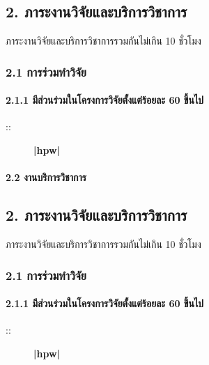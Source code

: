 \documentclass[a4paper,12pt,english]{sphinxmanual}
\begin{document}
\subsection{2. ภาระงานวิจัยและบริการวิชาการ}
\label{\detokenize{2research:id1}}\label{\detokenize{2research::doc}}
ภาระงานวิจัยและบริการวิชาการรวมกันไม่เกิน 10 ชั่วโมง


\subsubsection{2.1 การร่วมทำวิจัย}
\label{\detokenize{2research:id2}}

\paragraph{2.1.1 มีส่วนร่วมในโครงการวิจัยตั้งแต่ร้อยละ 60 ขึ้นไป}
\label{\detokenize{2research:id3}}\begin{description}
\item[{::}]   {\color{red}\bfseries{}|hpw|}

\end{description}


\paragraph{2.2 งานบริการวิชาการ}
\label{\detokenize{2research:id4}}

\subsection{2. ภาระงานวิจัยและบริการวิชาการ}
\label{\detokenize{3service:id1}}\label{\detokenize{3service::doc}}
ภาระงานวิจัยและบริการวิชาการรวมกันไม่เกิน 10 ชั่วโมง


\subsubsection{2.1 การร่วมทำวิจัย}
\label{\detokenize{3service:id2}}

\paragraph{2.1.1 มีส่วนร่วมในโครงการวิจัยตั้งแต่ร้อยละ 60 ขึ้นไป}
\label{\detokenize{3service:id3}}\begin{description}
\item[{::}]   {\color{red}\bfseries{}|hpw|}

\end{description}
\end{document}
